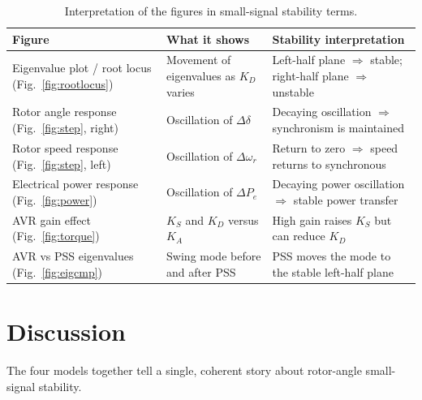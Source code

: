 \documentclass[12pt,a4paper]{article}
\newcommand{\dwr}{\Delta\omega_r}
\newcommand{\ddel}{\Delta\delta}
\begin{document}
\begin{table}[H]
\centering
\caption{Interpretation of the figures in small-signal stability terms.}
\label{tab:figinterp}
\renewcommand{\arraystretch}{1.3}
\begin{tabularx}{\textwidth}{@{}>{\raggedright\arraybackslash{}}p{4.3cm}Y Y@{}}
\toprule
\textbf{Figure} & \textbf{What it shows} & \textbf{Stability interpretation} \\
\midrule
Eigenvalue plot / root locus (Fig.~\ref{fig:rootlocus})
 & Movement of eigenvalues as $K_D$ varies
 & Left-half plane $\Rightarrow$ stable; right-half plane $\Rightarrow$ unstable \\
Rotor angle response (Fig.~\ref{fig:step}, right)
 & Oscillation of $\ddel$
 & Decaying oscillation $\Rightarrow$ synchronism is maintained \\
Rotor speed response (Fig.~\ref{fig:step}, left)
 & Oscillation of $\dwr$
 & Return to zero $\Rightarrow$ speed returns to synchronous \\
Electrical power response (Fig.~\ref{fig:power})
 & Oscillation of $\Delta P_e$
 & Decaying power oscillation $\Rightarrow$ stable power transfer \\
AVR gain effect (Fig.~\ref{fig:torque})
 & $K_S$ and $K_D$ versus $K_A$
 & High gain raises $K_S$ but can reduce $K_D$ \\
AVR vs PSS eigenvalues (Fig.~\ref{fig:eigcmp})
 & Swing mode before and after PSS
 & PSS moves the mode to the stable left-half plane \\
\bottomrule
\end{tabularx}
\end{table}

\section{Discussion}
\label{sec:discussion}

The four models together tell a single, coherent story about rotor-angle
small-signal stability.
\end{document}
